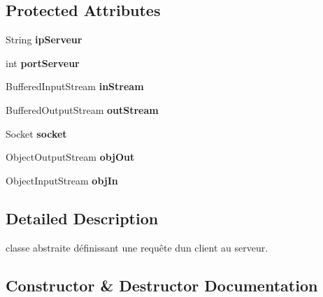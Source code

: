 \subsection*{Protected Attributes}
\begin{DoxyCompactItemize}
\item 
\mbox{\label{classrequete_1_1Requete_ac459a04e0e05713cf40d2810141730f1}} 
String {\bfseries ip\+Serveur}
\item 
\mbox{\label{classrequete_1_1Requete_a09be09377c9ce1174e027c9bc852c0ab}} 
int {\bfseries port\+Serveur}
\item 
\mbox{\label{classrequete_1_1Requete_a487b0b95bcb22cd79e17b8ba2756daa6}} 
Buffered\+Input\+Stream {\bfseries in\+Stream}
\item 
\mbox{\label{classrequete_1_1Requete_aec10f73f1c9edcba8a6aeffbd9dc932b}} 
Buffered\+Output\+Stream {\bfseries out\+Stream}
\item 
\mbox{\label{classrequete_1_1Requete_a8bbfc163d41bdf7d3ed614e0341a1bc8}} 
Socket {\bfseries socket}
\item 
\mbox{\label{classrequete_1_1Requete_ab9ab3c25659d29238eba73b1538e6e2f}} 
Object\+Output\+Stream {\bfseries obj\+Out}
\item 
\mbox{\label{classrequete_1_1Requete_ad73ac8592d56fed8ed0234fe92354bc7}} 
Object\+Input\+Stream {\bfseries obj\+In}
\end{DoxyCompactItemize}


\subsection{Detailed Description}
classe abstraite définissant une requête d\textquotesingle{}un client au serveur. 

\subsection{Constructor \& Destructor Documentation}
\mbox{\label{classrequete_1_1Requete_a6ed8eefb9335b37f2348f5c323a46b53}} 
